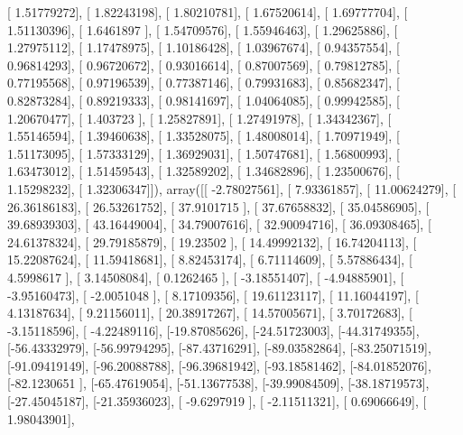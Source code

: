 \documentclass{article}
\begin{document}
       [ 1.51779272],
       [ 1.82243198],
       [ 1.80210781],
       [ 1.67520614],
       [ 1.69777704],
       [ 1.51130396],
       [ 1.6461897 ],
       [ 1.54709576],
       [ 1.55946463],
       [ 1.29625886],
       [ 1.27975112],
       [ 1.17478975],
       [ 1.10186428],
       [ 1.03967674],
       [ 0.94357554],
       [ 0.96814293],
       [ 0.96720672],
       [ 0.93016614],
       [ 0.87007569],
       [ 0.79812785],
       [ 0.77195568],
       [ 0.97196539],
       [ 0.77387146],
       [ 0.79931683],
       [ 0.85682347],
       [ 0.82873284],
       [ 0.89219333],
       [ 0.98141697],
       [ 1.04064085],
       [ 0.99942585],
       [ 1.20670477],
       [ 1.403723  ],
       [ 1.25827891],
       [ 1.27491978],
       [ 1.34342367],
       [ 1.55146594],
       [ 1.39460638],
       [ 1.33528075],
       [ 1.48008014],
       [ 1.70971949],
       [ 1.51173095],
       [ 1.57333129],
       [ 1.36929031],
       [ 1.50747681],
       [ 1.56800993],
       [ 1.63473012],
       [ 1.51459543],
       [ 1.32589202],
       [ 1.34682896],
       [ 1.23500676],
       [ 1.15298232],
       [ 1.32306347]]), array([[ -2.78027561],
       [  7.93361857],
       [ 11.00624279],
       [ 26.36186183],
       [ 26.53261752],
       [ 37.9101715 ],
       [ 37.67658832],
       [ 35.04586905],
       [ 39.68939303],
       [ 43.16449004],
       [ 34.79007616],
       [ 32.90094716],
       [ 36.09308465],
       [ 24.61378324],
       [ 29.79185879],
       [ 19.23502   ],
       [ 14.49992132],
       [ 16.74204113],
       [ 15.22087624],
       [ 11.59418681],
       [  8.82453174],
       [  6.71114609],
       [  5.57886434],
       [  4.5998617 ],
       [  3.14508084],
       [  0.1262465 ],
       [ -3.18551407],
       [ -4.94885901],
       [ -3.95160473],
       [ -2.0051048 ],
       [  8.17109356],
       [ 19.61123117],
       [ 11.16044197],
       [  4.13187634],
       [  9.21156011],
       [ 20.38917267],
       [ 14.57005671],
       [  3.70172683],
       [ -3.15118596],
       [ -4.22489116],
       [-19.87085626],
       [-24.51723003],
       [-44.31749355],
       [-56.43332979],
       [-56.99794295],
       [-87.43716291],
       [-89.03582864],
       [-83.25071519],
       [-91.09419149],
       [-96.20088788],
       [-96.39681942],
       [-93.18581462],
       [-84.01852076],
       [-82.1230651 ],
       [-65.47619054],
       [-51.13677538],
       [-39.99084509],
       [-38.18719573],
       [-27.45045187],
       [-21.35936023],
       [ -9.6297919 ],
       [ -2.11511321],
       [  0.69066649],
       [  1.98043901],
\end{document}
